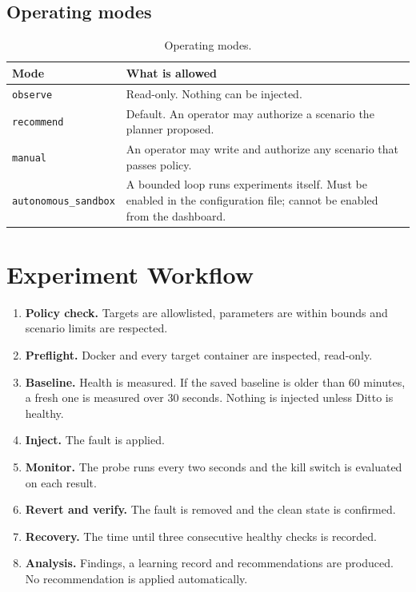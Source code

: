 \documentclass[11pt,a4paper]{article}
\begin{document}
\subsection{Operating modes}

\begin{table}[h]
\centering
\begin{tabularx}{\textwidth}{@{}lL@{}}
\toprule
\textbf{Mode} & \textbf{What is allowed} \\
\midrule
\texttt{observe} & Read-only. Nothing can be injected. \\
\texttt{recommend} & Default. An operator may authorize a scenario the planner proposed. \\
\texttt{manual} & An operator may write and authorize any scenario that passes policy. \\
\texttt{autonomous\_sandbox} & A bounded loop runs experiments itself. Must be enabled in the configuration file; cannot be enabled from the dashboard. \\
\bottomrule
\end{tabularx}
\caption{Operating modes.}
\end{table}

\section{Experiment Workflow}

\begin{enumerate}
  \item \textbf{Policy check.} Targets are allowlisted, parameters are within
        bounds and scenario limits are respected.
  \item \textbf{Preflight.} Docker and every target container are inspected,
        read-only.
  \item \textbf{Baseline.} Health is measured. If the saved baseline is older
        than 60 minutes, a fresh one is measured over 30 seconds. Nothing is
        injected unless Ditto is healthy.
  \item \textbf{Inject.} The fault is applied.
  \item \textbf{Monitor.} The probe runs every two seconds and the kill switch
        is evaluated on each result.
  \item \textbf{Revert and verify.} The fault is removed and the clean state
        is confirmed.
  \item \textbf{Recovery.} The time until three consecutive healthy checks is
        recorded.
  \item \textbf{Analysis.} Findings, a learning record and recommendations are
        produced. No recommendation is applied automatically.
\end{enumerate}
\end{document}
